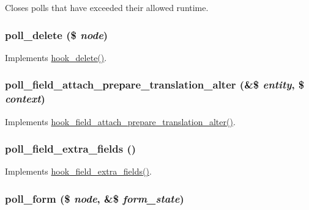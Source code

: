 Closes polls that have exceeded their allowed runtime. \hypertarget{poll_8module_a65b1706919a5825906bfdb855e75e6d6}{
\subsubsection[{poll\_\-delete}]{\setlength{\rightskip}{0pt plus 5cm}poll\_\-delete (\$ {\em node})}}
\label{poll_8module_a65b1706919a5825906bfdb855e75e6d6}
Implements \hyperlink{group__node__api__hooks_ga8588d8a814e8aef059d9e0f842904b35}{hook\_\-delete()}. \hypertarget{poll_8module_a9cc51afbc7581dda213bbc409e8b3419}{
\subsubsection[{poll\_\-field\_\-attach\_\-prepare\_\-translation\_\-alter}]{\setlength{\rightskip}{0pt plus 5cm}poll\_\-field\_\-attach\_\-prepare\_\-translation\_\-alter (\&\$ {\em entity}, \/  \$ {\em context})}}
\label{poll_8module_a9cc51afbc7581dda213bbc409e8b3419}
Implements \hyperlink{group__field__attach_ga497cd230a4a6bf6318784f6cf08e3758}{hook\_\-field\_\-attach\_\-prepare\_\-translation\_\-alter()}. \hypertarget{poll_8module_a7719263baee7eed1b9dc2e6c0e5e0f76}{
\subsubsection[{poll\_\-field\_\-extra\_\-fields}]{\setlength{\rightskip}{0pt plus 5cm}poll\_\-field\_\-extra\_\-fields ()}}
\label{poll_8module_a7719263baee7eed1b9dc2e6c0e5e0f76}
Implements \hyperlink{group__hooks_ga7100332aa5b4d5f6ba72534599d133e5}{hook\_\-field\_\-extra\_\-fields()}. \hypertarget{poll_8module_a32cd2c5b13bfc397270c31e2d26765de}{
\subsubsection[{poll\_\-form}]{\setlength{\rightskip}{0pt plus 5cm}poll\_\-form (\$ {\em node}, \/  \&\$ {\em form\_\-state})}}
